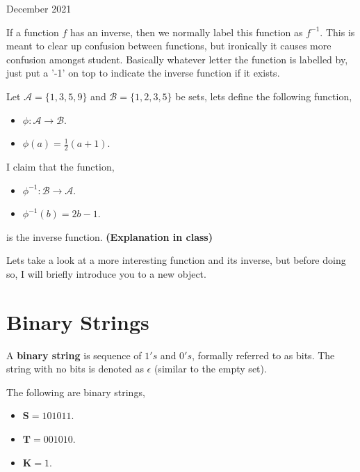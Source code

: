 \documentclass[12pt,oneside]{book} %
\begin{document}
\begin{lec}{December 2021}
\begin{notn}
  If a function $f$ has an inverse, then we normally label this function as $f^{-1}$. This is meant to clear up confusion
  between functions, but ironically it causes more confusion amongst student. Basically whatever letter the function is 
  labelled by, just put a  '-1' on top to indicate the inverse function if it exists.
\end{notn}

\begin{ex}
  Let $ \mathcal{A} = \{1,3,5,9\} $ and $ \mathcal{B} = \{1,2,3,5\} $ be sets, lets define the
  following function, 
  \begin{itemize}
    \item $\phi \colon \mathcal{A} \to \mathcal{B}$.
    \item $\phi(a) = \frac{1}{2}(a + 1)$.
  \end{itemize}
  I claim that the function,
  \begin{itemize}
    \item $\phi^{-1} \colon \mathcal{B} \to \mathcal{A}$.
    \item $\phi^{-1}(b) = 2b - 1$.
  \end{itemize}
  is the inverse function. \textbf{(Explanation in class)}
\end{ex}

Lets take a look at a more interesting function and its inverse, but before doing so, I will briefly introduce you to a 
new object.

\newpage

\section{Binary Strings}

\begin{defn}
    A \textbf{binary string} is sequence of $1's$ and  $0's$, formally referred to as bits. The string with no bits is denoted as $\epsilon$
    (similar to the empty set).
\end{defn}

\begin{ex}
  The following are binary strings,
  \begin{itemize}
    \item $\mathbf{S} = 101011$. 
    \item $\mathbf{T} = 001010$.
    \item $\mathbf{K} = 1$.
  \end{itemize}
\end{ex}


\end{lec}
\end{document}

